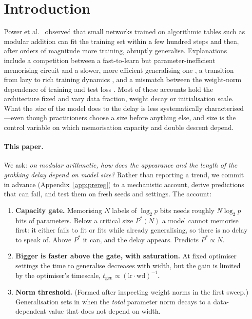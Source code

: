 \documentclass{article} %
\begin{document}
\section{Introduction}
Power et al.\ \citep{power2022grokking} observed that small networks trained on algorithmic tables such as modular addition can fit the training set within a few hundred steps and then, after orders of magnitude more training, abruptly generalise. Explanations include a competition between a fast-to-learn but parameter-inefficient memorising circuit and a slower, more efficient generalising one \citep{varma2023explaining,nanda2023progress}, a transition from lazy to rich training dynamics \citep{kumar2024grokking}, and a mismatch between the weight-norm dependence of training and test loss \citep{liu2023omnigrok}. Most of these accounts hold the architecture fixed and vary data fraction, weight decay or initialisation scale. What the \emph{size} of the model does to the delay is less systematically characterised---even though practitioners choose a size before anything else, and size is the control variable on which memorisation capacity \citep{zhang2017rethinking,morris2025memorize} and double descent \citep{nakkiran2020deep,davies2023unifying} depend.

\paragraph{This paper.} We ask: \emph{on modular arithmetic, how does the appearance and the length of the grokking delay depend on model size?} Rather than reporting a trend, we commit in advance (Appendix~\ref{app:prereg}) to a mechanistic account, derive predictions that can fail, and test them on fresh seeds and settings. The account:

\begin{enumerate}
\item[\textbf{H-CAP}] \textbf{Capacity gate.} Memorising $N$ labels of $\log_2 p$ bits needs roughly $N\log_2 p$ bits of parameters. Below a critical size $P^\ast(N)$ a model cannot memorise first: it either fails to fit or fits while already generalising, so there is no delay to speak of. Above $P^\ast$ it can, and the delay appears. Predicts $P^\ast\propto N$.
\item[\textbf{H-SPEED}] \textbf{Bigger is faster above the gate, with saturation.} At fixed optimiser settings the time to generalise decreases with width, but the gain is limited by the optimiser's timescale, $t_{\mathrm{gen}}\propto(\mathrm{lr}\cdot\mathrm{wd})^{-1}$.
\item[\textbf{H-NORM}] \textbf{Norm threshold.} (Formed after inspecting weight norms in the first sweep.) Generalisation sets in when the \emph{total} parameter norm decays to a data-dependent value that does not depend on width.
\end{enumerate}
\end{document}
